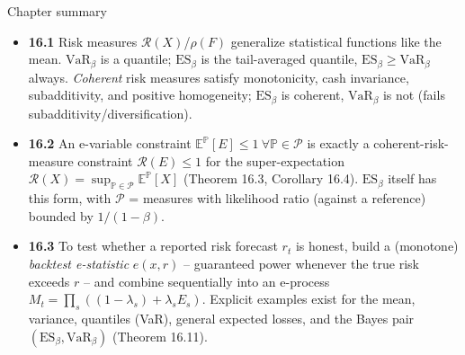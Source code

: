 \documentclass[aspectratio=169,10pt]{beamer}
\newcommand{\PP}{\mathbb{P}}
\newcommand{\EE}{\mathbb{E}}
\newcommand{\1}{\mathbb{1}}
\begin{document}
\begin{frame}{Chapter summary}

\begin{itemize}
\item \textbf{16.1} Risk measures $\mathcal R(X)$/$\rho(F)$ generalize statistical functions like the mean. $\mathrm{VaR}_\beta$ is a quantile; $\mathrm{ES}_\beta$ is the tail-averaged quantile, $\mathrm{ES}_\beta \ge \mathrm{VaR}_\beta$ always. \emph{Coherent} risk measures satisfy monotonicity, cash invariance, subadditivity, and positive homogeneity; $\mathrm{ES}_\beta$ is coherent, $\mathrm{VaR}_\beta$ is not (fails subadditivity/diversification).
\item \textbf{16.2} An e-variable constraint $\EE^{\PP}[E]\le1\ \forall \PP\in\mathcal P$ is exactly a coherent-risk-measure constraint $\mathcal R(E)\le1$ for the super-expectation $\mathcal R(X)=\sup_{\PP\in\mathcal P}\EE^{\PP}[X]$ (Theorem 16.3, Corollary 16.4). $\mathrm{ES}_\beta$ itself has this form, with $\mathcal P$ = measures with likelihood ratio (against a reference) bounded by $1/(1-\beta)$.
\item \textbf{16.3} To test whether a reported risk forecast $r_t$ is honest, build a (monotone) \emph{backtest e-statistic} $e(x,r)$ -- guaranteed power whenever the true risk exceeds $r$ -- and combine sequentially into an e-process $M_t=\prod_s((1-\lambda_s)+\lambda_s E_s)$. Explicit examples exist for the mean, variance, quantiles (VaR), general expected losses, and the Bayes pair $(\mathrm{ES}_\beta,\mathrm{VaR}_\beta)$ (Theorem 16.11).
\end{itemize}

\end{frame}
\end{document}
